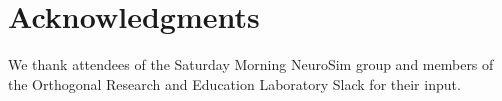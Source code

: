 \documentclass{sigchi}
\begin{document}
\section{Acknowledgments}

We thank attendees of the Saturday Morning NeuroSim group and members of the Orthogonal Research and Education Laboratory Slack for their input.



%
%
%
%
%
\balance{}


\balance{}



\end{document}
